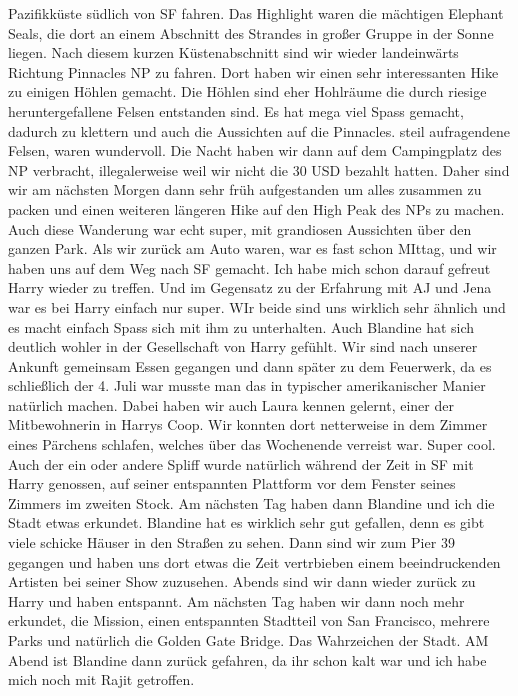 \documentclass[11pt]{book}
\begin{document}
Pazifikküste südlich von SF fahren. Das Highlight waren die mächtigen Elephant Seals, die dort an einem Abschnitt des Strandes in großer Gruppe 
in der Sonne liegen. Nach diesem kurzen Küstenabschnitt sind wir wieder landeinwärts Richtung Pinnacles NP zu fahren. Dort haben wir einen sehr interessanten 
Hike zu einigen Höhlen gemacht. Die Höhlen sind eher Hohlräume die durch riesige heruntergefallene Felsen entstanden sind. Es hat mega viel Spass gemacht, 
dadurch zu klettern und auch die Aussichten auf die Pinnacles. steil aufragendene Felsen, waren wundervoll. Die Nacht haben wir dann auf dem Campingplatz 
des NP verbracht, illegalerweise weil wir nicht die 30 USD bezahlt hatten. Daher sind wir am nächsten Morgen dann sehr früh aufgestanden um alles zusammen 
zu packen und einen weiteren längeren Hike auf den High Peak des NPs zu machen. Auch diese Wanderung war echt super, mit grandiosen Aussichten über den ganzen 
Park. Als wir zurück am Auto waren, war es fast schon MIttag, und wir haben uns auf dem Weg nach SF gemacht. Ich habe mich schon darauf gefreut Harry 
wieder zu treffen. Und im Gegensatz zu der Erfahrung mit AJ und Jena war es bei Harry einfach nur super. WIr beide sind uns wirklich sehr ähnlich und es 
macht einfach Spass sich mit ihm zu unterhalten. Auch Blandine hat sich deutlich wohler in der Gesellschaft von Harry gefühlt. Wir sind nach unserer 
Ankunft gemeinsam Essen gegangen und dann später zu dem Feuerwerk, da es schließlich der 4. Juli war musste man das in typischer amerikanischer Manier 
natürlich machen. Dabei haben wir auch Laura kennen gelernt, einer der Mitbewohnerin in Harrys Coop. Wir konnten dort netterweise in dem Zimmer eines 
Pärchens schlafen, welches über das Wochenende verreist war. Super cool. Auch der ein oder andere Spliff wurde natürlich während der Zeit in SF mit 
Harry genossen, auf seiner entspannten Plattform vor dem Fenster seines Zimmers im zweiten Stock. Am nächsten Tag haben dann Blandine und ich die Stadt 
etwas erkundet. Blandine hat es wirklich sehr gut gefallen, denn es gibt viele schicke Häuser in den Straßen zu sehen. Dann sind wir zum Pier 39 gegangen 
und haben uns dort etwas die Zeit vertrbieben einem beeindruckenden Artisten bei seiner Show zuzusehen. Abends sind wir dann wieder zurück zu Harry und haben 
entspannt. Am nächsten Tag haben wir dann noch mehr erkundet, die Mission, einen entspannten Stadtteil von San Francisco, mehrere Parks und natürlich die 
Golden Gate Bridge. Das Wahrzeichen der Stadt. AM Abend ist Blandine dann zurück gefahren, da ihr schon kalt war und ich habe mich noch mit Rajit getroffen. 
\end{document}
